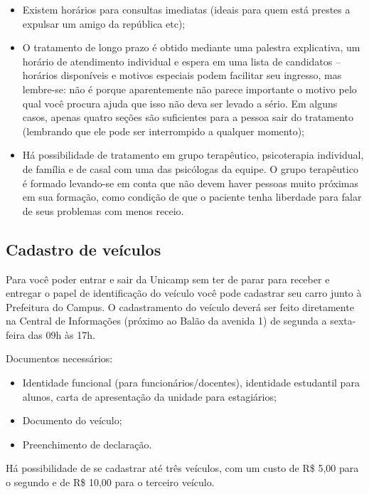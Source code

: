 \begin{itemize}
    \item  Existem horários para consultas imediatas (ideais para quem está
        prestes a expulsar um amigo da república etc);

    \item  O tratamento de longo prazo é obtido mediante uma palestra
        explicativa, um horário de atendimento individual e espera em uma lista
        de candidatos -- horários disponíveis e motivos especiais podem
        facilitar seu ingresso, mas lembre-se: não é porque aparentemente não
        parece importante o motivo pelo qual você procura ajuda que isso não
        deva ser levado a sério. Em alguns casos, apenas quatro seções são
        suficientes para a pessoa sair do tratamento (lembrando que ele pode ser
        interrompido a qualquer momento);

    \item  Há possibilidade de tratamento em grupo terapêutico, psicoterapia
        individual, de família e de casal com uma das psicólogas da equipe. O
        grupo terapêutico é formado levando-se em conta que não devem haver
        pessoas muito próximas em sua formação, como condição de que o paciente
        tenha liberdade para falar de seus problemas com menos receio.
\end{itemize}

\subsection{Cadastro de veículos}

Para você poder entrar e sair da Unicamp sem ter de parar para receber e
entregar o papel de identificação do veículo você pode cadastrar seu carro junto
à Prefeitura do Campus. O cadastramento do veículo deverá ser feito diretamente
na Central de Informações (próximo ao Balão da avenida 1) de segunda a
sexta-feira das 09h às 17h.

Documentos necessários:

\begin{itemize}
    \item  Identidade funcional (para funcionários/docentes), identidade
        estudantil para alunos, carta de apresentação da unidade para
        estagiários;
    \item  Documento do veículo;
    \item  Preenchimento de declaração.
\end{itemize}
Há possibilidade de se cadastrar até três veículos, com um custo de R\$ 5,00
para o segundo e de R\$ 10,00 para o terceiro veículo.

